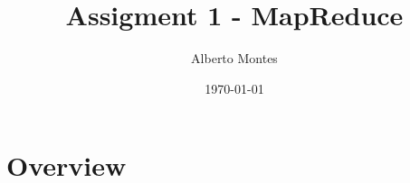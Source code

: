 \documentclass{ethz_report}
\title{Assigment 1 - MapReduce}
\author{Alberto Montes}
\date{\today}
\begin{document}
\maketitle

\section{Overview}
\blindtext
\end{document}
